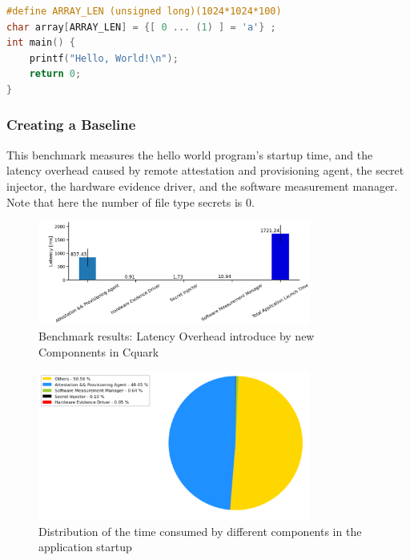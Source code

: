 \begin{lstlisting}[language=C,frame=single,caption=Hello World Program Variant,label=code2]
#define ARRAY_LEN (unsigned long)(1024*1024*100)    
char array[ARRAY_LEN] = {[ 0 ... (1) ] = 'a'} ;
int main() {     
    printf("Hello, World!\n");
    return 0;
}
\end{lstlisting}


\subsubsection{Creating a Baseline}

This benchmark measures the hello world program's startup time, and the latency overhead caused by remote attestation and provisioning agent, the secret injector, the hardware evidence driver, and the software measurement manager. Note that here the number of file type secrets is 0.

\begin{figure}[H]
    \centering
    \includegraphics[width=0.8\textwidth]{images/application_start_microtest_baseline_time_overhead_each_cmp.PNG}
    \caption[Benchmark results: Latency Overhead introduce by new Componnents in Cquark]{Benchmark results: Latency Overhead introduce by new Componnents in Cquark}
    \label{fig:application_start_microtest_baseline_time_overhead_each_cmp}
\end{figure}

\begin{figure}[H]
    \centering
    \includegraphics[width=0.8\textwidth]{images/application_start_microtest_baseline_time_distribution.PNG}
    \caption[Time  Distribution of the application startup ]{Distribution of the time consumed by different components in the application startup}
    \label{fig:application_start_microtest_baseline_time_distribution}
\end{figure}



